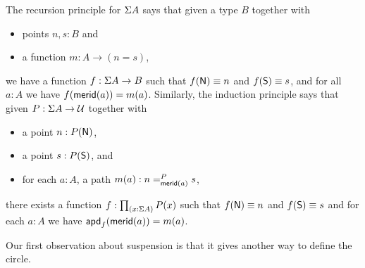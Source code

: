 %
The recursion principle for $\susp A$ says that given a type $B$ together with
\begin{itemize}
\item points $n,s:B$ and
\item a function $m:A \to (n=s)$,
\end{itemize}
we have a function $f:\susp A \to B$ such that $f(\north)\jdeq n$ and $f(\south)\jdeq s$, and for all $a:A$ we have $\ap f {\merid(a)} = m(a)$.
%
Similarly, the induction principle says that given $P:\susp A \to \type$ together with
\begin{itemize}
\item a point $n:P(\north)$,
\item a point $s:P(\south)$, and
\item for each $a:A$, a path $m(a):\dpath P{\merid(a)}ns$,
\end{itemize}
there exists a function $f:\prd{x:\susp A} P(x)$ such that $f(\north)\jdeq n$ and $f(\south)\jdeq s$ and for each $a:A$ we have $\apd f {\merid(a)} = m(a)$.

Our first observation about suspension is that it gives another way to define the circle.

